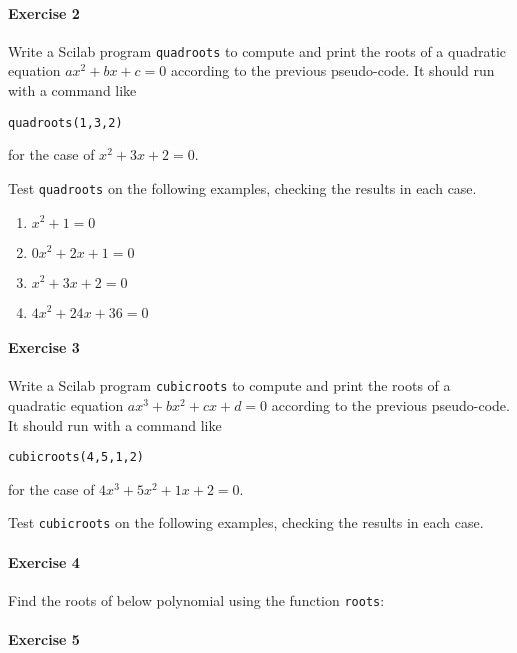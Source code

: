 \documentclass[openany]{book}
\begin{document}
\paragraph{Exercise 2}
Write a Scilab program {\tt quadroots} to compute and print the roots of a quadratic equation $a x^2+ b x + c = 0$ according to  the previous pseudo-code.
It should run with a command like
\begin{center}
{\tt quadroots(1,3,2)}
\end{center}
for the case of $x^2+ 3x + 2 = 0$.

Test {\tt quadroots} on the following examples, checking the results in each case.
\begin{enumerate}
\item $x^2+ 1 = 0$
\item $0x^2+ 2x + 1 = 0$
\item $x^2+ 3x + 2 = 0$
\item $4x^2+ 24x + 36 = 0$
\end{enumerate}


\paragraph{Exercise 3}
Write a Scilab program {\tt cubicroots} to compute and print the roots of a quadratic equation $ax^3+ bx^2 + cx +d = 0$ according to  the previous pseudo-code.
It should run with a command like
\begin{center}
{\tt cubicroots(4,5,1,2)}
\end{center}
for the case of $4x^3+5x^2+ 1x + 2 = 0$.

Test {\tt cubicroots} on the following examples, checking the results in each case.


\paragraph{Exercise 4}
Find the roots of below polynomial using the function {\tt roots}:


\paragraph{Exercise 5}




\setcounter{chapter}{9}
\end{document}
